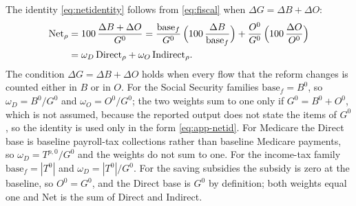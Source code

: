 The identity \eqref{eq:netidentity} follows from \eqref{eq:fiscal} when $\Delta G=\Delta B+\Delta O$:
\begin{equation}\label{eq:app-netid}
\begin{split}
\text{Net}_{\rho}&=100\,\frac{\Delta B+\Delta O}{G^{0}}
=\frac{\text{base}_f}{G^{0}}\,\Bigl(100\,\frac{\Delta B}{\text{base}_f}\Bigr)+\frac{O^{0}}{G^{0}}\,\Bigl(100\,\frac{\Delta O}{O^{0}}\Bigr)\\
&=\omega_D\,\text{Direct}_{\rho}+\omega_O\,\text{Indirect}_{\rho}.
\end{split}
\end{equation}
The condition $\Delta G=\Delta B+\Delta O$ holds when every flow that the reform changes is counted either in $B$ or in $O$. For the Social Security families $\text{base}_f=B^{0}$, so $\omega_D=B^{0}/G^{0}$ and $\omega_O=O^{0}/G^{0}$; the two weights sum to one only if $G^{0}=B^{0}+O^{0}$, which is not assumed, because the reported output does not state the items of $G^{0}$, so the identity is used only in the form \eqref{eq:app-netid}. For Medicare the Direct base is baseline payroll-tax collections rather than baseline Medicare payments, so $\omega_D=T^{p,0}/G^{0}$ and the weights do not sum to one. For the income-tax family $\text{base}_f=|T^{0}|$ and $\omega_D=|T^{0}|/G^{0}$. For the saving subsidies the subsidy is zero at the baseline, so $O^{0}=G^{0}$, and the Direct base is $G^{0}$ by definition; both weights equal one and Net is the sum of Direct and Indirect.

